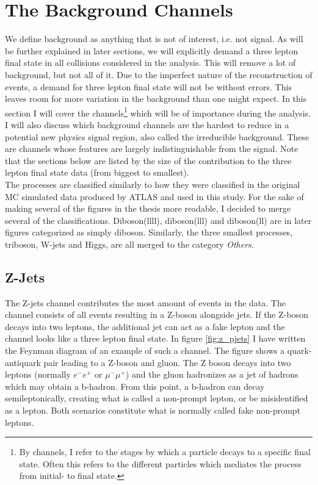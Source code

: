 \section{The Background Channels}\label{sec:bkg}
We define background as anything that is not of interest, i.e. not signal. 
As will be further explained in  later sections, we will explicitly demand a three lepton final state in all collisions 
considered in the analysis. This will remove a lot of background, but not all of it. Due to the imperfect nature of the 
reconstruction of events, a demand for three lepton final state will not be without errors. This leaves room for more 
variation in the background than one might expect. In this section I will cover the channels\footnote{By channels,
I refer to the stages by which a particle decays to a specific final state. Often this refers to 
the different particles which mediates the process from initial- to final state.} which will 
be of importance during the analysis. I will also discuss which background channels are the hardest 
to reduce in a potential new physics signal region, also called the irreducible background. These are 
channels whose features are largely indistinguishable from the signal. Note that the sections below
are listed by the size of the contribution to the three lepton final state data (from biggest to smallest).  
\\
The processes are classified similarly to how they were classified in the original \ac{MC} simulated data produced 
by \ac{ATLAS} and used in this study. For the sake of making several of the figures in the thesis more readable, I decided 
to merge several of the classifications. Diboson(llll), diboson(lll) and diboson(ll) are in later figures categorized as 
simply diboson. Similarly, the three smallest processes, triboson, W-jets and Higgs, are all merged to the category
\emph{Others}.
\subsection*{Z-Jets}
The Z-jets channel contributes the most amount of events in the data. The channel consists of all events
resulting in a Z-boson alongside jets. If the Z-boson decays into two leptons, the additional 
jet can act as a fake lepton and the channel looks like a three lepton final state. In figure \ref{fig:z_pjets} 
I have written the Feynman diagram of an example of such a channel. The figure shows a quark-antiquark pair leading 
to a Z-boson and gluon. The Z boson decays into two leptons (normally $e^-e^+$ or $\mu^- \mu^+$) and the gluon hadronizes 
as a jet of hadrons which may obtain a b-hadron. From this point, a b-hadron can decay semileptonically, creating what is called
a non-prompt lepton, or be misidentified as a lepton. Both scenarios constitute what is normally called fake non-prompt leptons.

